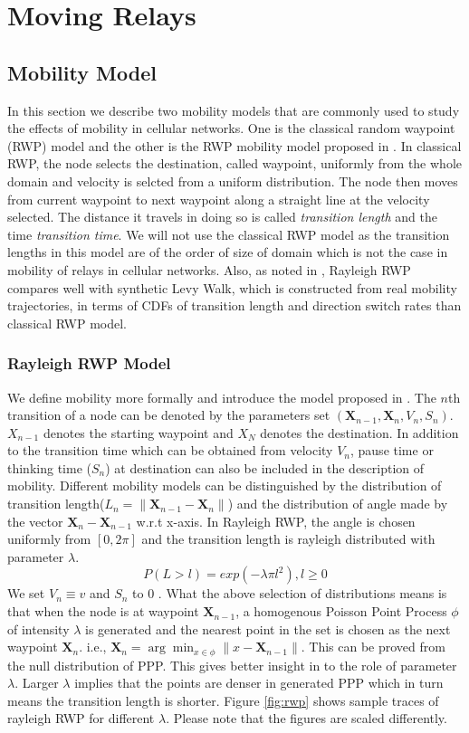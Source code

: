 \chapter{Moving Relays}
\section{Mobility Model}
In this section we describe two mobility models that are commonly used to study the effects of
mobility in cellular networks. One is the classical random waypoint (RWP) model and the other
is the RWP mobility model proposed in \cite{lin}. In classical RWP, the node selects the destination, called waypoint, uniformly from the whole domain and velocity is selcted from a uniform distribution. The node then moves from current waypoint to next waypoint along a straight line at the velocity selected. The distance it travels in doing so is called \textit{transition length} and the time \textit{transition time}. We will not use the classical RWP model as the
transition lengths in this model are of the order of size of domain which is not 
the case in mobility of relays in cellular networks. Also, as noted in \cite{lin}, Rayleigh RWP compares well with synthetic Levy Walk, which is constructed from real mobility trajectories, in terms of CDFs of transition length and direction switch rates than classical RWP model. 
\subsection{Rayleigh RWP Model}
We define mobility more formally and introduce the model proposed in \cite{lin}. The $n$th transition of a node can be denoted by the parameters set $(\mathbf{X}_{n-1},\mathbf{X}_n, V_n, S_n) $. $X_{n-1}$ denotes the starting waypoint and $X_N$ denotes the destination. In addition to the transition time which can be obtained from velocity $V_n$, pause time or thinking time ($S_n$) at destination can also be included in the description of mobility. 
Different mobility models can be distinguished by the distribution of transition length($L_n = \|\mathbf{X}_{n-1} - \mathbf{X}_n \|$) and the distribution of angle made by the vector
$\mathbf{X}_n - \mathbf{X}_{n-1}$ w.r.t x-axis. 
In Rayleigh RWP, the angle is chosen uniformly from $[0,2\pi]$ and the transition length is rayleigh distributed with parameter $\lambda$. 
\begin{equation}
	P(L > l) = exp(-\lambda \pi l^2), l \geq 0
\end{equation}
We set $V_n\equiv v$ and $S_n$ to 0 . What the above selection of distributions means is 
that when the node is at waypoint $\mathbf{X}_{n-1}$, a homogenous Poisson Point Process $\phi$ of intensity $\lambda$ is generated and the nearest point in the set is chosen as the next waypoint $\mathbf{X}_n$. i.e., $\mathbf{X}_n = \arg \min_{x\in\phi} \| x - \mathbf{X}_{n-1}\|$. This can be proved from the null distribution of PPP. This gives better insight in to the role of parameter $\lambda$. Larger $\lambda$ implies that the points are denser in generated PPP
which in turn means the transition length is shorter. Figure \ref{fig:rwp} shows sample traces
of rayleigh RWP for different $\lambda$. Please note that the figures are scaled differently.

